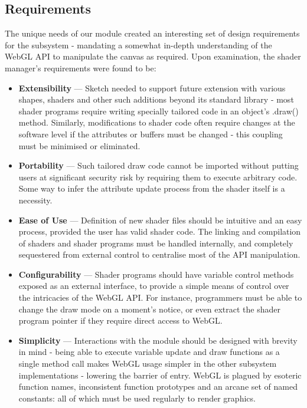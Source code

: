 \documentclass{l3proj}
\begin{document}
\subsection{Requirements}
\label{arch-shad-req}
The unique needs of our module created an interesting set of design requirements for the subsystem - mandating a somewhat in-depth understanding of the WebGL API to manipulate the canvas as required. Upon examination, the shader manager's requirements were found to be:
\begin{itemize}
\item \textbf{Extensibility} --- Sketch needed to support future extension with various shapes, shaders and other such additions beyond its standard library - most shader programs require writing specially tailored code in an object's .draw() method. Similarly, modifications to shader code often require changes at the software level if the attributes or buffers must be changed - this coupling must be minimised or eliminated.
\item \textbf{Portability} --- Such tailored draw code cannot be imported without putting users at significant security risk by requiring them to execute arbitrary code. Some way to infer the attribute update process from the shader itself is a necessity.
\item \textbf{Ease of Use} --- Definition of new shader files should be intuitive and an easy process, provided the user has valid shader code. The linking and compilation of shaders and shader programs must be handled internally, and completely sequestered from external control to centralise most of the API manipulation.
\item \textbf{Configurability} --- Shader programs should have variable control methods exposed as an external interface, to provide a simple means of control over the intricacies of the WebGL API. For instance, programmers must be able to change the draw mode on a moment's notice, or even extract the shader program pointer if they require direct access to WebGL.
\item \textbf{Simplicity} --- Interactions with the module should be designed with brevity in mind - being able to execute variable update and draw functions as a single method call makes WebGL usage simpler in the other subsystem implementations - lowering the barrier of entry. WebGL is plagued by esoteric function names, inconsistent function prototypes and an arcane set of named constants: all of which must be used regularly to render graphics.
\end{itemize}
\end{document}
